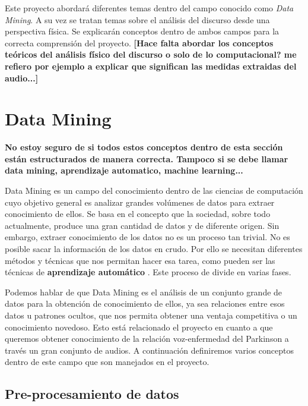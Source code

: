 
Este proyecto abordará diferentes temas dentro del campo conocido como \textit{Data Mining}. A su vez se tratan temas sobre el análisis del discurso desde una perspectiva física. Se explicarán conceptos dentro de ambos campos para la correcta comprensión del proyecto.
\textbf{[Hace falta abordar los conceptos teóricos del análisis físico del discurso o solo de lo computacional? me refiero por ejemplo a explicar que significan las medidas extraidas del audio...]}


\section{Data Mining}

\textbf{No estoy seguro de si todos estos conceptos dentro de esta sección están estructurados de manera correcta. Tampoco si se debe llamar data mining, aprendizaje automatico, machine learning...}

Data Mining es un campo del conocimiento dentro de las ciencias de computación cuyo objetivo general es analizar grandes volúmenes de datos para extraer conocimiento de ellos. Se basa en el concepto que la sociedad, sobre todo actualmente, produce una gran cantidad de datos y de diferente origen. Sin embargo, extraer conocimiento de los datos no es un proceso tan trivial. No es posible sacar la información de los datos en crudo. Por ello se necesitan diferentes métodos y técnicas que nos permitan hacer esa tarea, como pueden ser las técnicas de \textbf{aprendizaje automático} \cite{datamining}. Este proceso de divide en varias fases.


Podemos hablar de que Data Mining es el análisis de un conjunto grande de datos para la obtención de conocimiento de ellos, ya sea relaciones entre esos datos u patrones ocultos, que nos permita obtener una ventaja competitiva o un conocimiento novedoso. Esto está relacionado el proyecto en cuanto a que queremos obtener conocimiento de la relación voz-enfermedad del Parkinson a través un gran conjunto de audios. A continuación definiremos varios conceptos dentro de este campo que son manejados en el proyecto.

\subsection{Pre-procesamiento de datos}


